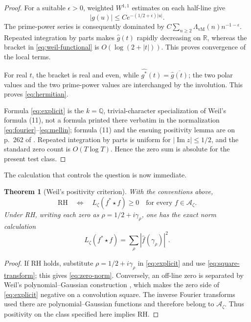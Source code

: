 \documentclass[11pt]{article}
\newtheorem{theorem}{Theorem}[section]
\theoremstyle{definition}
\theoremstyle{remark}
\numberwithin{equation}{section}
\newcommand{\cA}{\mathcal A}
\newcommand{\R}{\mathbb R}
\begin{document}
\begin{proof}
For a suitable $\epsilon>0$, weighted $W^{1,1}$ estimates on each
half-line give
\[
 |g(u)|\leq C e^{-(1/2+\epsilon)|u|}.
\]
The prime-power series is consequently dominated by
$C\sum_{n\geq2}\Lambda_{\mathrm{vM}}(n)n^{-1-\epsilon}$.
Repeated integration by parts makes $\widehat g(t)$ rapidly decreasing
on $\R$, whereas the bracket in \eqref{eq:weil-functional} is
$O(\log(2+|t|))$.  This proves convergence of the local terms.

For real $t$, the bracket is real and even, while
$\widehat{g^*}(t)=\overline{\widehat g(t)}$; the two polar values and
the two prime-power values are interchanged by the involution.  This
proves \eqref{eq:hermitian}.

Formula \eqref{eq:explicit} is the $k=\mathbb Q$, trivial-character
specialization of Weil's formula (11), not a formula printed there
verbatim in the normalization
\eqref{eq:fourier}--\eqref{eq:mellin}; formula (11) and the ensuing
positivity lemma are on p.~262 of \cite{Weil1952}.  Repeated integration
by parts is uniform for $|\operatorname{Im}z|\leq1/2$, and the standard
zero count is $O(T\log T)$.  Hence the zero sum is absolute for the
present test class.
\end{proof}

The calculation that controls the question is now immediate.

\begin{theorem}[Weil's positivity criterion]
With the conventions above,
\begin{equation}
 \mathrm{RH}
 \quad\Longleftrightarrow\quad
 L_\zeta(f^*\star f)\geq0
 \quad\text{for every }f\in\cA_\zeta.
 \label{eq:weil-criterion}
\end{equation}
Under RH, writing each zero as $\rho=1/2+i\gamma_\rho$, one has the
exact norm calculation
\begin{equation}
 L_\zeta(f^*\star f)
 =\sum_\rho |\widehat f(\gamma_\rho)|^2.
 \label{eq:zero-norm}
\end{equation}
\end{theorem}

\begin{proof}
If RH holds, substitute $\rho=1/2+i\gamma_\rho$ in
\eqref{eq:explicit} and use \eqref{eq:square-transform}; this gives
\eqref{eq:zero-norm}.  Conversely, an off-line zero is separated by
Weil's polynomial--Gaussian construction \cite[p.~263]{Weil1952}, which
makes the zero side of \eqref{eq:explicit} negative on a convolution
square.  The inverse Fourier transforms used there are
polynomial--Gaussian functions and therefore belong to $\cA_\zeta$.
Thus positivity on the class specified here implies RH.
\end{proof}
\end{document}
